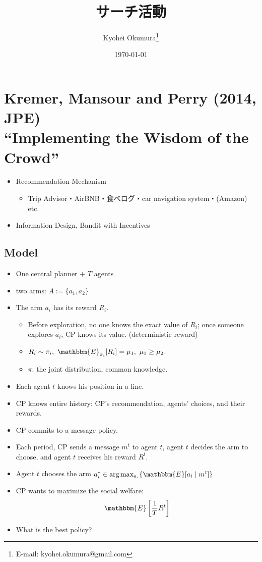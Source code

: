 \documentclass[11pt,a4paper,dvipdfmx]{article}
\newcommand{\1}{\mathbbm{1}}
\newcommand{\E}{\mathbbm{E}}
\begin{document}
\title{サーチ活動}
\author{Kyohei Okumura{\footnote{E-mail: kyohei.okumura@gmail.com}
}}
\date{\today}
\maketitle

\section{Kremer, Mansour and Perry (2014, JPE) \\ ``Implementing the Wisdom of the Crowd''}

\begin{itemize}
	\item Recommendation Mechanism
	\begin{itemize}
		\item Trip Advisor・AirBNB・食べログ・car navigation system・(Amazon) etc.
	\end{itemize}
	\item Information Design, Bandit with Incentives
\end{itemize}
\subsection{Model}
\begin{itemize}
	\item One central planner + $T$ agents
	\item two arms: $A := \{a_1, a_2\}$
	\item The arm $a_i$ has its reward $R_i$.
	\begin{itemize}
		\item Before exploration, no one knows the exact value of $R_i$; once someone explores $a_i$, CP knows its value. (deterministic reward)
		\item $R_i \sim \pi_i, \ \E_{\pi_i}[R_i] = \mu_1, \ \mu_1 \geq \mu_2$.
		\item $\pi$: the joint distribution, common knowledge.
	\end{itemize}
	\item Each agent $t$ knows his position in a line.
	\item CP knows entire history: CP's recommendation, agents' choices, and their rewards.
	\item CP commits to a message policy.
	\item Each period, CP sends a message $m^t$ to agent $t$, agent $t$ decides the arm to choose, and agent $t$ receives his reward $R^t$.
	\item Agent $t$ chooses the arm $a_i^* \in \arg \max_{a_i} \{\E[a_i \mid m^t]\}$
	\item CP wants to maximize the social welfare:
		$$\E\left[\frac{1}{T}R^t \right]$$
	\item What is the best policy?
\end{itemize}
\end{document}

